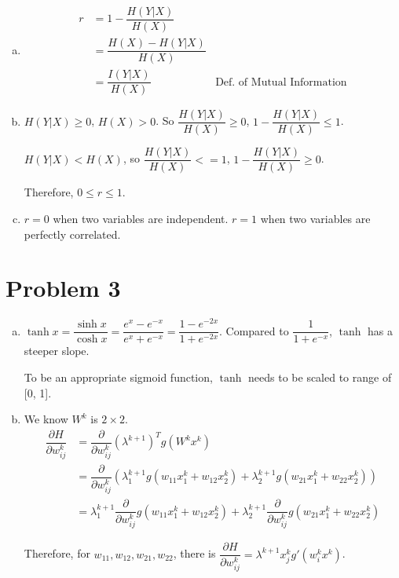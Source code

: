 \documentclass[10pt]{article}
\begin{document}
\begin{enumerate}[(a)]

\item 
\begin{align}
r &= 1 - \dfrac{H(Y|X)}{H(X)}\\
&= \dfrac{H(X) - H(Y|X)}{H(X)}\\
&= \dfrac{I(Y|X)}{H(X)} &\text{Def.\ of Mutual Information}
\end{align}

\item $H(Y|X) \geq 0$, $H(X) > 0$. So $\dfrac{H(Y|X)}{H(X)} \geq 0$,
$1 - \dfrac{H(Y|X)}{H(X)} \leq 1$.

$H(Y|X) < H(X)$, so $\dfrac{H(Y|X)}{H(X)} <= 1$, $1 -
\dfrac{H(Y|X)}{H(X)} \geq 0$.

Therefore, $0 \leq r \leq 1$.

\item $r = 0$ when two variables are independent. $r = 1$ when two
variables are perfectly correlated.

\end{enumerate}

\section*{Problem 3}
\begin{enumerate}[(a)]

\item  $\tanh x = \dfrac{\sinh x}{\cosh x} = \dfrac{e^x - e^{-x}}{e^x
+ e^{-x}} = \dfrac{1 - e^{-2x}}{1 + e^{-2x}}$. Compared to $\dfrac{1}{1
+ e^{-x}}$, $\tanh$ has a steeper slope.

To be an appropriate sigmoid function, $\tanh$ needs to be scaled to
range of [0, 1].

\item We know $W^k$ is $2 \times 2$.
\begin{align}
\dfrac{\partial H}{\partial w_{ij}^k} &= \dfrac{\partial}{\partial
w_{ij}^k} (\lambda^{k+1})^T g(W^kx^k)\\
&= \dfrac{\partial}{\partial w_{ij}^k} (\lambda_1^{k+1} g(w_{11}x_1^k
+ w_{12}x_2^k) + \lambda_2^{k+1} g(w_{21}x_1^k + w_{22}x_2^k))\\
&= \lambda_1^{k+1} \dfrac{\partial}{\partial w_{ij}^k} g(w_{11}x_1^k
+ w_{12}x_2^k) + \lambda_2^{k+1} \dfrac{\partial}{\partial w_{ij}^k}
g(w_{21}x_1^k + w_{22}x_2^k)
\end{align}

Therefore, for $w_{11}, w_{12}, w_{21}, w_{22}$, there is
$\dfrac{\partial H}{\partial w_{ij}^k} = \lambda^{k+1} x_j^k g'(w_i^k x^k)$.

\end{enumerate}
\end{document}
